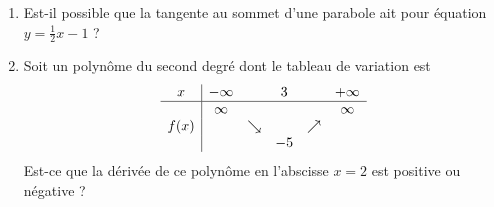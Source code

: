 
\begin{exercice}\label{exosmath-0402}

    \begin{enumerate}
        \item
            Est-il possible que la tangente au sommet d'une parabole ait pour équation \( y=\frac{ 1 }{2}x-1\) ?
        \item
            Soit un polynôme du second degré dont le tableau de variation est
            \begin{equation*}
                \begin{array}[]{c|ccccc}
                    x&-\infty&&3&&+\infty\\
                    \hline
                    &\infty&&&&\infty\\
                    f(x)&&\searrow&&\nearrow&\\
                    &&&-5&&\\
                \end{array}
            \end{equation*}
            Est-ce que la dérivée de ce polynôme en l'abscisse \( x=2\) est positive ou négative ?
    \end{enumerate}

\end{exercice}
